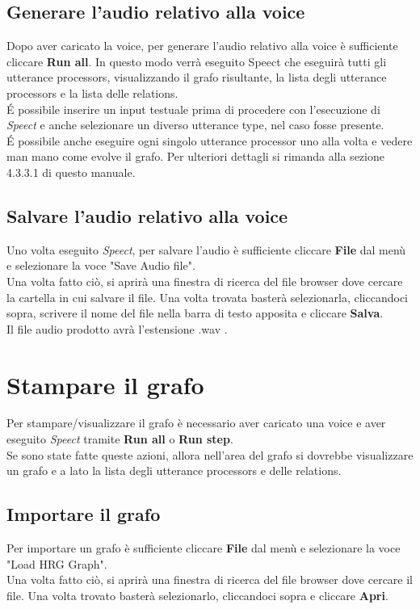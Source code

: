 \documentclass[openany,12pt,a4paper]{report}
\begin{document}
	\subsection{Generare l'audio relativo alla voice}
	Dopo aver caricato la voice, per generare l'audio relativo alla voice è sufficiente cliccare \textbf{Run all}. In questo modo verrà eseguito Speect che eseguirà tutti gli utterance processors, visualizzando il grafo risultante, la lista degli utterance processors e la lista delle relations.\\
	\'E possibile inserire un input testuale prima di procedere con l'esecuzione di \textit{Speect} e anche selezionare un diverso utterance type, nel caso fosse presente.\\
	\'E possibile anche eseguire ogni singolo utterance processor uno alla volta e vedere man mano come evolve il grafo. Per ulteriori dettagli si rimanda alla sezione 4.3.3.1 di questo manuale.
	
	\subsection{Salvare l'audio relativo alla voice}
	Uno volta eseguito \textit{Speect}, per salvare l'audio è sufficiente cliccare \textbf{File} dal menù e selezionare la voce "Save Audio file".\\
	Una volta fatto ciò, si aprirà una finestra di ricerca del file browser dove cercare la cartella in cui salvare il file. Una volta trovata basterà selezionarla, cliccandoci sopra, scrivere il nome del file nella barra di testo apposita e cliccare \textbf{Salva}.\\
	Il file audio prodotto avrà l'estensione .wav .
	
	\section{Stampare il grafo}
	Per stampare/visualizzare il grafo è necessario aver caricato una voice e aver eseguito \textit{Speect} tramite \textbf{Run all} o \textbf{Run step}.\\
	Se sono state fatte queste azioni, allora nell'area del grafo si dovrebbe visualizzare un grafo e a lato la lista degli utterance processors e delle relations.
	
	\subsection{Importare il grafo}
	Per importare un grafo è sufficiente cliccare \textbf{File} dal menù e selezionare la voce "Load HRG Graph".\\
	Una volta fatto ciò, si aprirà una finestra di ricerca del file browser dove cercare il file. Una volta trovato basterà selezionarlo, cliccandoci sopra e cliccare \textbf{Apri}.\\
	
\end{document}
